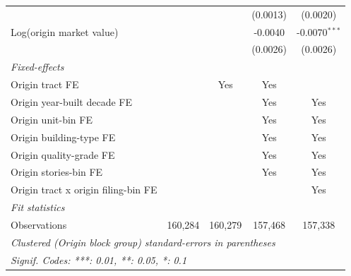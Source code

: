 \begin{tabular}{lcccc}
                                                  &                &              & (0.0013)        & (0.0020)\\   
   Log(origin market value)                       &                &              & -0.0040         & -0.0070$^{***}$\\   
                                                  &                &              & (0.0026)        & (0.0026)\\   
   \midrule
   \emph{Fixed-effects}\\
   Origin tract FE                                &                & Yes          & Yes             & \\  
   Origin year-built decade FE                    &                &              & Yes             & Yes\\  
   Origin unit-bin FE                             &                &              & Yes             & Yes\\  
   Origin building-type FE                        &                &              & Yes             & Yes\\  
   Origin quality-grade FE                        &                &              & Yes             & Yes\\  
   Origin stories-bin FE                          &                &              & Yes             & Yes\\  
   Origin tract x origin filing-bin FE            &                &              &                 & Yes\\  
   \midrule
   \emph{Fit statistics}\\
   Observations                                   & 160,284        & 160,279      & 157,468         & 157,338\\  
   \midrule \midrule
   \multicolumn{5}{l}{\emph{Clustered (Origin block group) standard-errors in parentheses}}\\
   \multicolumn{5}{l}{\emph{Signif. Codes: ***: 0.01, **: 0.05, *: 0.1}}\\
\end{tabular}
\par\endgroup
